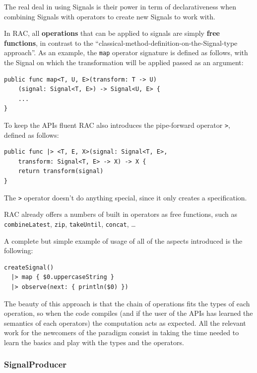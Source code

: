 The real deal in using Signals is their power in term of declarativeness
when combining Signals with operators to create new Signals to work
with.

In RAC, all \textbf{operations} that can be applied to signals are
simply \textbf{free functions}, in contrast to the
``classical-method-definition-on-the-Signal-type approach''. As an
example, the \texttt{map} operator signature is defined as follows, with
the Signal on which the transformation will be applied passed as an
argument:

\begin{verbatim}
public func map<T, U, E>(transform: T -> U)
    (signal: Signal<T, E>) -> Signal<U, E> {
    ...
}
\end{verbatim}

To keep the APIs fluent RAC also introduces the pipe-forward operator
\texttt{\textbar{}\textgreater{}}, defined as follows:

\begin{verbatim}
public func |> <T, E, X>(signal: Signal<T, E>,
    transform: Signal<T, E> -> X) -> X {
    return transform(signal)
}
\end{verbatim}

The \texttt{\textbar{}\textgreater{}} operator doesn't do anything
special, since it only creates a specification.

RAC already offers a numbers of built in operators as free functions,
such as \texttt{combineLatest}, \texttt{zip}, \texttt{takeUntil},
\texttt{concat}, \ldots{}

A complete but simple example of usage of all of the aspects introduced
is the following:

\begin{verbatim}
createSignal()
  |> map { $0.uppercaseString }
  |> observe(next: { println($0) })
\end{verbatim}

The beauty of this approach is that the chain of operations fits the
types of each operation, so when the code compiles (and if the user of
the APIs has learned the semantics of each operators) the computation
acts as expected. All the relevant work for the newcomers of the
paradigm consist in taking the time needed to learn the basics and play
with the types and the operators.

\subsubsection{SignalProducer}\label{signalproducer}

